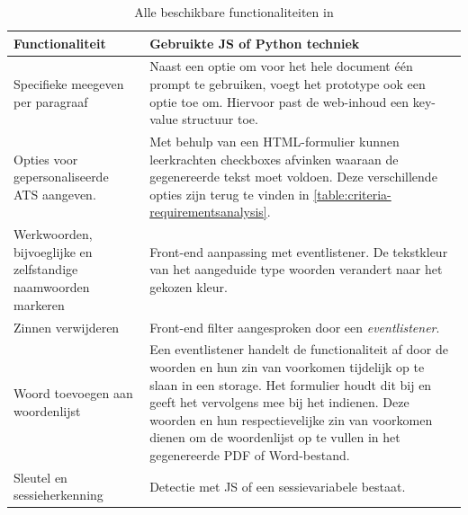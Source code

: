 \begin{center}
	\begin{table}
		\begin{tabular}{ | m{7cm} | m{8cm} | } 
			\hline
			\textbf{Functionaliteit} & Gebruikte JS of Python techniek \\
			\hline
			Specifieke meegeven per paragraaf & Naast een optie om voor het hele document één prompt te gebruiken, voegt het prototype ook een optie toe om. Hiervoor past de web-inhoud een key-value structuur toe. \\
			\hline
			Opties voor gepersonaliseerde ATS aangeven. & Met behulp van een HTML-formulier kunnen leerkrachten checkboxes afvinken waaraan de gegenereerde tekst moet voldoen. Deze verschillende opties zijn terug te vinden in \ref{table:criteria-requirementsanalysis}. \\
			\hline
			Werkwoorden, bijvoeglijke en zelfstandige naamwoorden markeren & Front-end aanpassing met eventlistener. De tekstkleur van het aangeduide type woorden verandert naar het gekozen kleur. \\
			\hline
			Zinnen verwijderen & Front-end filter aangesproken door een \textit{eventlistener}. \\
			\hline
			Woord toevoegen aan woordenlijst & Een eventlistener handelt de functionaliteit af door de woorden en hun zin van voorkomen tijdelijk op te slaan in een storage. Het formulier houdt dit bij en geeft het vervolgens mee bij het indienen. Deze woorden en hun respectievelijke zin van voorkomen dienen om de woordenlijst op te vullen in het gegenereerde PDF of Word-bestand. \\ 
			\hline
			Sleutel en sessieherkenning & Detectie met JS of een sessievariabele bestaat. \\
			\hline 
		\end{tabular}
	\caption{Alle beschikbare functionaliteiten in }
	\label{table:functionaliteiten-leerkrachten}
	\end{table}
\end{center}

